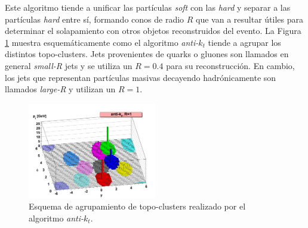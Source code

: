 Este algoritmo tiende a unificar las partículas \textit{soft} con las \textit{hard} y separar a las partículas \textit{hard} entre sí, formando conos de radio $R$ que van a resultar útiles para determinar el solapamiento con otros objetos reconstruidos del evento. La Figura \ref{antikt} muestra esquemáticamente como el algoritmo \textit{anti-$k_t$} tiende a agrupar los distintos topo-clusters. Jets provenientes de quarks o gluones son llamados en general \textit{small-R} jets y se utiliza un $R=0.4$ para su reconstrucción. En cambio, los jets que representan partículas masivas decayendo hadrónicamente son llamados \textit{large-R} y utilizan un $R=1$.

\begin{figure}
\centering
  \includegraphics[width=0.5\textwidth]{images/antikt.png}
\caption{Esquema de agrupamiento de topo-clusters realizado por el algoritmo \textit{anti-$k_t$}.  
 }
  \label{antikt}
\end{figure}

